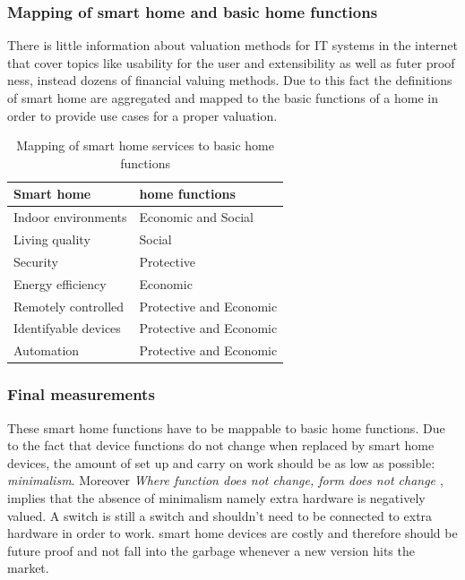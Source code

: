 		\subsubsection{Mapping of smart home and basic home functions}
			There is little information about valuation methods for IT systems in the internet that cover topics like usability for the user and extensibility as well as futer proof ness, instead dozens of financial valuing methods. Due to this fact the definitions of smart home are aggregated and mapped to the basic functions of a home in order to provide use cases for a proper valuation.

			\begin{table}[h]
				\centering
				\caption{Mapping of smart home services to basic home functions}
				\label{Homekit_Accessory_Profile}
				\begin{tabular}{ll}
					\textbf{Smart home}	& \textbf{home functions} \\
					\hline
					Indoor environments			& Economic and Social \\
					Living quality				& Social \\
					Security					& Protective \\
					Energy efficiency			& Economic \\
					Remotely controlled			& Protective and Economic \\
					Identifyable devices 		& Protective and Economic \\
					Automation					& Protective and Economic \\

				\end{tabular}
			\end{table}


			\subsubsection{Final measurements}

				These smart home functions have to be mappable to basic home functions. Due to the fact that device functions do not change when replaced by smart home devices, the amount of set up and carry on work should be as low as possible: \textit{minimalism}. Moreover \textit{Where function does not change, form does not change \parencite{SullivansRule}}, implies that the absence of minimalism namely extra hardware is negatively valued. A switch is still a switch and shouldn't need to be connected to extra hardware in order to work. smart home devices are costly and therefore should be future proof and not fall into the garbage whenever a new version hits the market. \\

